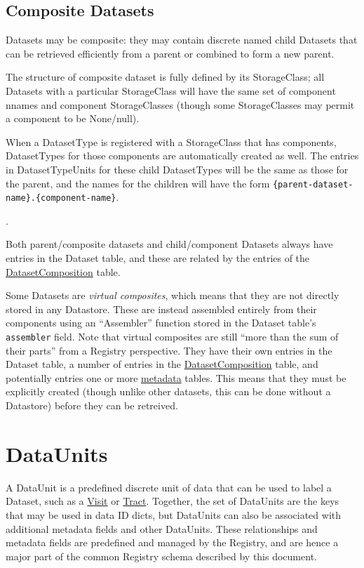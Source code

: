 \documentclass[DM,toc]{lsstdoc}
\newcommand{\tblref}[1]{\hyperref[tbl:#1]{#1}}
\newcommand{\unitref}[1]{\hyperref[unit:#1]{#1}}
\newcommand{\coltable}[1]{
    \begin{table}[htb]
        {
            \footnotesize
            
        }
        \caption{#1 Columns}
        \label{tbl:#1}
    \end{table}
}
\begin{document}
\coltable{DatasetType}
\coltable{DatasetTypeUnits}
\coltable{DatasetTypeMetadata}


\subsection{Composite Datasets}
\label{sec:composite-datasets}

Datasets may be composite: they may contain discrete named child Datasets that can be retrieved efficiently from a parent or combined to form a new parent.

The structure of composite dataset is fully defined by its StorageClass; all Datasets with a particular StorageClass will have the same set of component nnames and component StorageClasses (though some StorageClasses may permit a component to be None/null).

When a DatasetType is registered with a StorageClass that has components, DatasetTypes for those components are automatically created as well.
The entries in DatasetTypeUnits for these child DatasetTypes will be the same as those for the parent, and the names for the children will have the form \texttt{\{parent-dataset-name\}.\{component-name\}}.

\coltable{DatasetComposition}.

Both parent/composite datasets and child/component Datasets always have entries in the Dataset table, and these are related by the entries of the \tblref{DatasetComposition} table.

Some Datasets are \emph{virtual composites}, which means that they are not
directly stored in any Datastore.
These are instead assembled entirely from their components using an ``Assembler'' function stored in the Dataset table's \texttt{assembler} field.
Note that virtual composites are still ``more than the sum of their parts'' from a Registry perspective.
They have their own entries in the Dataset table, a number of entries in the \tblref{DatasetComposition} table, and potentially entries one or more \hyperref[sec:metadata]{metadata} tables.
This means that they must be explicitly created (though unlike other datasets, this can be done without a Datastore) before they can be retreived.

\section{DataUnits}
\label{sec:dataunits}

A DataUnit is a predefined discrete unit of data that can be used to label a Dataset, such as a \unitref{Visit} or \unitref{Tract}.
Together, the set of DataUnits are the keys that may be used in data ID dicts, but DataUnits can also be associated with additional metadata fields and other DataUnits.
These relationships and metadata fields are predefined and managed by the Registry, and are hence a major part of the common Registry schema described by this document.
\end{document}
